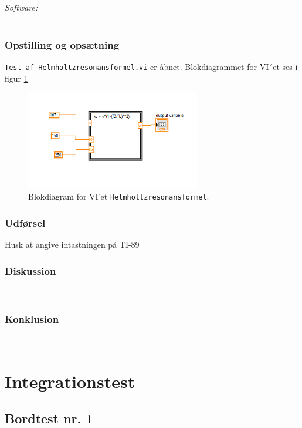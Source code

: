 		\textit{Software:}\\
		\labview\\
	
		\subsubsection{Opstilling og opsætning}
		\texttt{Test af Helmholtzresonansformel.vi} er åbnet. Blokdiagrammet for VI´et ses i figur \ref{fig:HHRF} 
		
		\begin{figure}
			\centering
			\includegraphics[width=3in]{HelmholtzformelLabVIEW}
			\caption{Blokdiagram for VI'et \texttt{Helmholtzresonansformel}.}
			\label{fig:HHRF}
		\end{figure}
	
		\subsubsection{Udførsel}
			 
			 Husk at angive intastningen på TI-89

		\subsubsection{Diskussion} 
	-
	
	
		\subsubsection{Konklusion}
		 
	- 




\section{Integrationstest}

	\subsection{Bordtest nr. 1} %
	\label{bordtest1}

